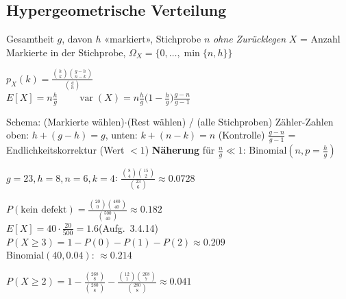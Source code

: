\subsection{Hypergeometrische Verteilung}
\begin{merke}
\begin{itemize}
\pfeil Gesamtheit $g$, davon $h$ «markiert», Stichprobe $n$ \emph{ohne Zurücklegen}
\pfeil $X$ = Anzahl Markierte in der Stichprobe, $\Omega_X=\{0,\dots,\min\{n,h\}\}$
\end{itemize}
\end{merke}
\begin{formel}
$\displaystyle p_X(k)=\frac{\binom hk\binom{g-h}{n-k}}{\binom gn}$\\[3pt]
$\displaystyle E[X]=n\frac hg\qquad
\operatorname{var}(X)=n\frac hg\Big(1-\frac hg\Big)\frac{g-n}{g-1}$
\end{formel}
\begin{itemize}
\pfeil Schema: (Markierte wählen)$\cdot$(Rest wählen) / (alle Stichproben)
\pfeil Zähler-Zahlen oben: $h+(g-h)=g$, unten: $k+(n-k)=n$ (Kontrolle)
\pfeil $\frac{g-n}{g-1}$ = Endlichkeitskorrektur (Wert $<1$)
\pfeil \textbf{Näherung} für $\frac ng\ll1$: $\mathrm{Binomial}(n,p=\frac hg)$
\end{itemize}
\begin{bsp}
$g=23,h=8,n=6,k=4$: $\frac{\binom84\binom{15}2}{\binom{23}6}\approx0.0728$
\end{bsp}
\begin{bsp}
$P(\text{kein defekt})=\frac{\binom{20}0\binom{480}{40}}{\binom{500}{40}}\approx0.182$\\
$E[X]=40\cdot\frac{20}{500}=1.6$\quad (Aufg.\ 3.4.14)\\
$P(X\ge3)=1-P(0)-P(1)-P(2)\approx0.209$\\
Binomial$(40,0.04)$: $\approx0.214$
\end{bsp}
\begin{bsp}
$P(X\ge2)=1-\frac{\binom{268}8}{\binom{280}8}-\frac{\binom{12}1\binom{268}7}{\binom{280}8}\approx0.041$
\end{bsp}

